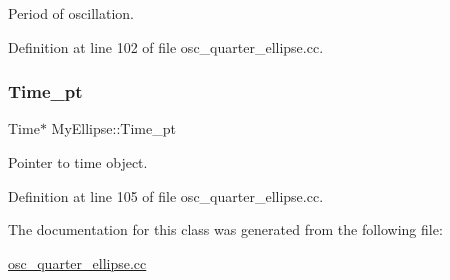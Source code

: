 Period of oscillation. 



Definition at line 102 of file osc\+\_\+quarter\+\_\+ellipse.\+cc.

\mbox{\label{classMyEllipse_abc1c4c863a599ce87bdff1abb9971953}} 
\subsubsection{\texorpdfstring{Time\+\_\+pt}{Time\_pt}}
{\footnotesize\ttfamily Time$\ast$ My\+Ellipse\+::\+Time\+\_\+pt\hspace{0.3cm}{\ttfamily [private]}}



Pointer to time object. 



Definition at line 105 of file osc\+\_\+quarter\+\_\+ellipse.\+cc.



The documentation for this class was generated from the following file\+:\begin{DoxyCompactItemize}
\item 
\hyperlink{osc__quarter__ellipse_8cc}{osc\+\_\+quarter\+\_\+ellipse.\+cc}\end{DoxyCompactItemize}
